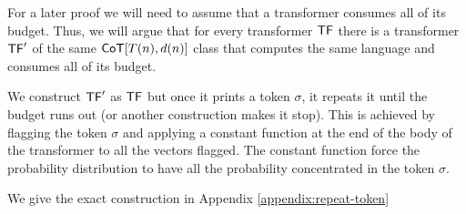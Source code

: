For a later proof we will need to assume that a transformer consumes all of its budget.
Thus, we will argue that for every transformer $\mathsf{TF}$ there is a transformer $\mathsf{TF}'$ of the same $\mathsf{CoT}[T(n), d(n)]$ class that computes the same language and consumes all of its budget.

We construct $\mathsf{TF}'$ as $\mathsf{TF}$ but once it prints a token $\sigma$, it repeats it until the budget runs out (or another construction makes it stop).
This is achieved by flagging the token $\sigma$ and applying a constant function at the end of the body of the transformer to all  the vectors flagged.
The constant function force the probability distribution to have all the probability concentrated in the token $\sigma$.

We give the exact construction in Appendix \ref{appendix:repeat-token}